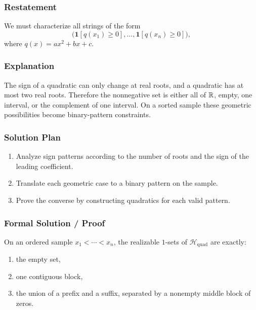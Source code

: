 \documentclass{article}
\newcommand{\classB}{\mathcal{H}_{\mathrm{quad}}}
\begin{document}
\begin{solutionbox}

\subsubsection{Restatement}

We must characterize all strings of the form
\[
\bigl(\mathbf{1}[q(x_1)\ge 0],\dots,\mathbf{1}[q(x_n)\ge 0]\bigr),
\]
where \(q(x)=a x^2+b x+c\).

\subsubsection{Explanation}

The sign of a quadratic can only change at real roots, and a quadratic has at
most two real roots. Therefore the nonnegative set is either all of \(\mathbb{R}\),
empty, one interval, or the complement of one interval. On a sorted sample these
geometric possibilities become binary-pattern constraints.

\subsubsection{Solution Plan}

\begin{enumerate}[leftmargin=2.5em]
    \item Analyze sign patterns according to the number of roots and the sign of
    the leading coefficient.
    \item Translate each geometric case to a binary pattern on the sample.
    \item Prove the converse by constructing quadratics for each valid pattern.
\end{enumerate}

\subsubsection{Formal Solution / Proof}

\begin{theorem}
On an ordered sample \(x_1<\cdots<x_n\), the realizable \(1\)-sets of
\(\classB\) are exactly:
\begin{enumerate}[leftmargin=2.5em]
    \item the empty set,
    \item one contiguous block,
    \item the union of a prefix and a suffix, separated by a nonempty middle
    block of zeros.
\end{enumerate}
\end{theorem}


\end{solutionbox}
\end{document}

